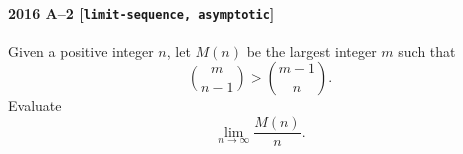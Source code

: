 \paragraph{2016 A--2 \textnormal{[\texttt{limit-sequence, asymptotic}]}}
Given a positive integer $n$, let $M(n)$ be the largest integer $m$ such that
\[
\binom{m}{n-1} > \binom{m-1}{n}.
\]
Evaluate
\[
\lim_{n \to \infty} \frac{M(n)}{n}.
\]
